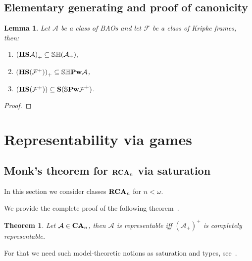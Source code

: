 \documentclass{article}
\theoremstyle{defin}
\theoremstyle{theorem}
\newtheorem{theorem}{Theorem}
\theoremstyle{claim}
\theoremstyle{prop}
\theoremstyle{lemma}
\newtheorem{lemma}{Lemma}
\theoremstyle{fact}
\theoremstyle{remark}
\theoremstyle{ex}
\theoremstyle{col}
\theoremstyle{question}
\begin{document}
\subsection{Elementary generating and proof of canonicity}

\begin{lemma} Let $\mathcal{A}$ be a class of BAOs and let $\mathcal{F}$ be a class of Kripke frames, then:

  \begin{enumerate}
    \item ${({\bf HS} \mathcal{A})}_+ \subseteq \mathbb{S} \mathbb{H} (\mathcal{A}_+)$,
    \item ${({\bf HS} (\mathcal{F}^+))}_+ \subseteq \mathbb{S} \mathbb{H} {\bf Pw} \mathcal{A}$,
    \item $({\bf HS} (\mathcal{F}^+)) \subseteq {\bf S} ({\mathbb{S} {\bf Pw} \mathcal{F}}^+)$.
  \end{enumerate}

\end{lemma}

\begin{proof}

\end{proof}

\section{Representability via games}

\subsection{Monk's theorem for ${\bf RCA}_n$ via saturation}

In this section we consider classes ${\bf RCA}_n$ for $n < \omega$.

We provide the complete proof of the following theorem~\cite[Theorem 3.4.3]{hirsch2013completions}.
\begin{theorem}\label{finitecanon}
Let $\mathcal{A} \in {\bf CA}_n$, then $\mathcal{A}$ is representable iff ${(\mathcal{A}_+)}^{+}$ is completely representable.
\end{theorem}

For that we need such model-theoretic notions as saturation and types, see~\cite[Section 6.3]{hodges1993model}.
\end{document}
